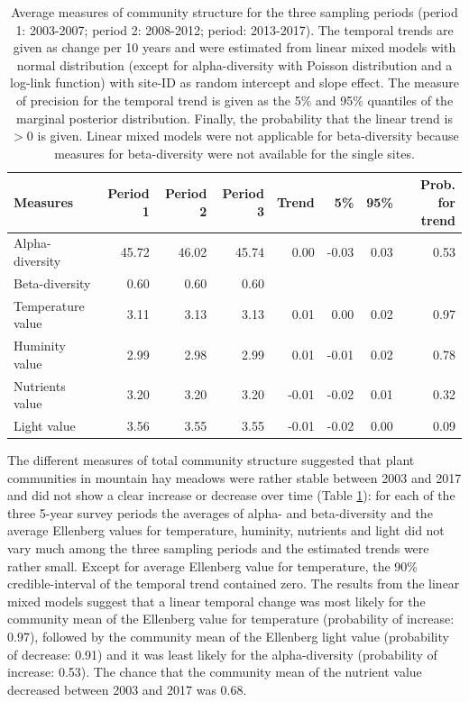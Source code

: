 \documentclass[fleqn,10pt,lineno]{wlpeerj} %
\theoremstyle{definition}
\theoremstyle{definition}
\theoremstyle{definition}
\theoremstyle{remark}
\begin{document}
\begin{table}

\caption{\label{tab:communitytrendstab}Average measures of community structure for the three sampling periods (period 1: 2003-2007; period 2: 2008-2012; period: 2013-2017). The temporal trends are given as  change per 10 years and were estimated from linear mixed models with normal distribution (except for alpha-diversity with Poisson distribution and a log-link function) with site-ID as random intercept and slope effect. The measure of precision for the temporal trend is given as the 5\% and 95\% quantiles of the marginal posterior distribution. Finally, the probability that the linear trend is $> 0$ is given. Linear mixed models were not applicable for beta-diversity because measures for beta-diversity were not available for the single sites.}
\centering
\begin{tabular}[t]{lrrrrrrr}
\toprule
Measures & Period 1 & Period 2 & Period 3 & Trend & 5\% & 95\% & Prob. for trend\\
\midrule
Alpha-diversity & 45.72 & 46.02 & 45.74 & 0.00 & -0.03 & 0.03 & 0.53\\
Beta-diversity & 0.60 & 0.60 & 0.60 &  &  &  & \\
Temperature value & 3.11 & 3.13 & 3.13 & 0.01 & 0.00 & 0.02 & 0.97\\
Huminity value & 2.99 & 2.98 & 2.99 & 0.01 & -0.01 & 0.02 & 0.78\\
Nutrients value & 3.20 & 3.20 & 3.20 & -0.01 & -0.02 & 0.01 & 0.32\\
Light value & 3.56 & 3.55 & 3.55 & -0.01 & -0.02 & 0.00 & 0.09\\
\bottomrule
\end{tabular}
\end{table}

The different measures of total community structure suggested that plant
communities in mountain hay meadows were rather stable between 2003 and
2017 and did not show a clear increase or decrease over time (Table
\ref{tab:communitytrendstab}): for each of the three 5-year survey
periods the averages of alpha- and beta-diversity and the average
Ellenberg values for temperature, huminity, nutrients and light did not
vary much among the three sampling periods and the estimated trends were
rather small. Except for average Ellenberg value for temperature, the
90\% credible-interval of the temporal trend contained zero. The results
from the linear mixed models suggest that a linear temporal change was
most likely for the community mean of the Ellenberg value for
temperature (probability of increase: 0.97), followed by the community
mean of the Ellenberg light value (probability of decrease: 0.91) and it
was least likely for the alpha-diversity (probability of increase:
0.53). The chance that the community mean of the nutrient value
decreased between 2003 and 2017 was 0.68.
\end{document}
